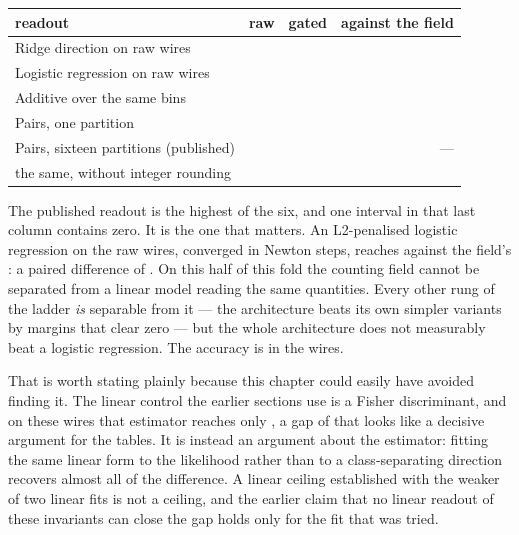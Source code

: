 \documentclass[11pt]{article}
\begin{document}
\begin{center}
\begin{tabular}{@{}lrrr@{}}
\toprule
readout & raw & gated & against the field \\
\midrule
Ridge direction on raw wires & \RdRidgeRaw{} & \RdRidgeAuc{} & \RdRidgeDelta{} \RdRidgeCI{} \\
Logistic regression on raw wires & \RdLogitRaw{} & \RdLogitAuc{} & \RdLogitDelta{} \RdLogitCI{} \\
Additive over the same bins & \RdAdditiveRaw{} & \RdAdditiveAuc{} & \RdAdditiveDelta{} \RdAdditiveCI{} \\
Pairs, one partition & \RdOneRoundRaw{} & \RdOneRoundAuc{} & \RdOneRoundDelta{} \RdOneRoundCI{} \\
Pairs, sixteen partitions (published) & \RdFieldRaw{} & \RdFieldAuc{} & --- \\
\quad the same, without integer rounding & \RdUnroundedRaw{} & \RdUnroundedAuc{} & \RdUnroundedDelta{} \RdUnroundedCI{} \\
\bottomrule
\end{tabular}
\end{center}

The published readout is the highest of the six, and one interval in that last
column contains zero. It is the one that matters. An L2-penalised logistic
regression on the raw wires, converged in \RdNewtonSteps{} Newton steps, reaches
\RdLogitAuc{} against the field's \RdFieldAuc{}: a paired difference of
\RdLogitDelta{} \RdLogitCI{}. On this half of this fold the counting field
cannot be separated from a linear model reading the same quantities. Every other
rung of the ladder \emph{is} separable from it --- the architecture beats its own
simpler variants by margins that clear zero --- but the whole architecture does
not measurably beat a logistic regression. The accuracy is in the wires.

That is worth stating plainly because this chapter could easily have avoided
finding it. The linear control the earlier sections use is a Fisher discriminant,
and on these wires that estimator reaches only \RdRidgeAuc{}, a gap of
\RdRidgeDelta{} that looks like a decisive argument for the tables. It is
instead an argument about the estimator: fitting the same linear form to the
likelihood rather than to a class-separating direction recovers almost all of
the difference. A linear ceiling established with the weaker of two linear fits
is not a ceiling, and the earlier claim that no linear readout of these
invariants can close the gap holds only for the fit that was tried.
\end{document}
